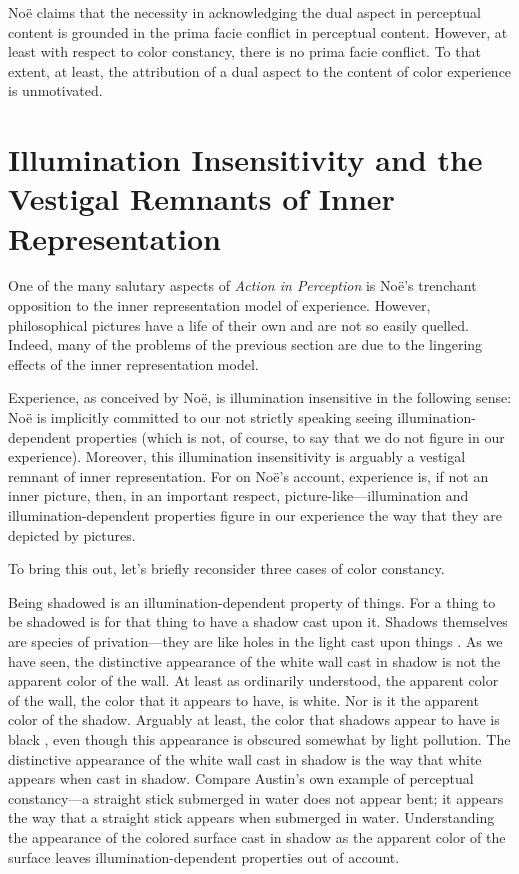 \documentclass[12pt]{article}
\begin{document}

\noindent Noë claims that the necessity in acknowledging the dual aspect in perceptual content is grounded in the prima facie conflict in perceptual content. However, at least with respect to color constancy, there is no prima facie conflict. To that extent, at least, the attribution of a dual aspect to the content of color experience is unmotivated.


\section{Illumination Insensitivity and the Vestigal Remnants of Inner Representation} %
\label{sec:vestigal_remnants_of_inner_representations}

One of the many salutary aspects of \emph{Action in Perception} is Noë's trenchant opposition to the inner representation model of experience. However, philosophical pictures have a life of their own and are not so easily quelled. Indeed, many of the problems of the previous section are due to the lingering effects of the inner representation model.

Experience, as conceived by Noë, is illumination insensitive in the following sense: Noë is implicitly committed to our not strictly speaking seeing illumina\-tion-dependent properties (which is not, of course, to say that we do not figure in our experience). Moreover, this illumination insensitivity is arguably a vestigal remnant of inner representation. For on Noë's account, experience is, if not an inner picture, then, in an important respect, picture-like---illumination and illumination-dependent properties figure in our experience the way that they are depicted by pictures. 

To bring this out, let's briefly reconsider three cases of color constancy.

Being shadowed is an illumination-dependent property of things. For a thing to be shadowed is for that thing to have a shadow cast upon it. Shadows themselves are species of privation---they are like holes in the light cast upon things \citep[see][]{Sorensen:2008kx}. As we have seen, the distinctive appearance of the white wall cast in shadow is not the apparent color of the wall. At least as ordinarily understood, the apparent color of the wall, the color that it appears to have, is white. Nor is it the apparent color of the shadow. Arguably at least, the color that shadows appear to have is black \citep{Sorensen:2008kx}, even though this appearance is obscured somewhat by light pollution. The distinctive appearance of the white wall cast in shadow is the way that white appears when cast in shadow. Compare Austin's \citeyearpar{Austin:1962lr} own example of perceptual constancy---a straight stick submerged in water does not appear bent; it appears the way that a straight stick appears when submerged in water. Understanding the appearance of the colored surface cast in shadow as the apparent color of the surface leaves illumination-dependent properties out of account.
\end{document}
